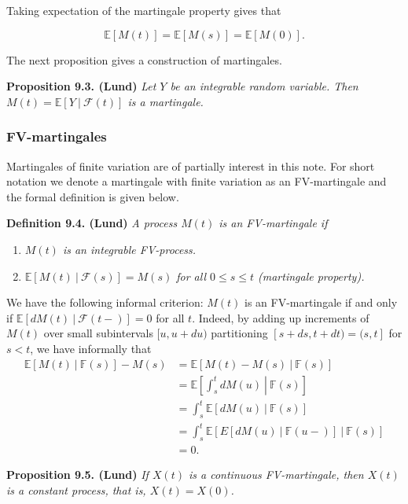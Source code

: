 \documentclass[a4paper,10pt,openany]{book}
\providecommand{\tightlist}{%
 \setlength{\itemsep}{0pt}\setlength{\parskip}{0pt}}
\begin{document}
Taking expectation of the martingale property gives that

\[
\mathbb E[M(t)]=\mathbb E[M(s)]=\mathbb E[M(0)].
\]

The next proposition gives a construction of martingales.

\textbf{Proposition 9.3. (Lund)} \emph{Let \(Y\) be an integrable random variable. Then \(M(t)=\mathbb E[Y\ \vert\ \mathcal F(t)]\) is a martingale.}

\hypertarget{fv-martingales}{%
\subsubsection{FV-martingales}\label{fv-martingales}}

Martingales of finite variation are of partially interest in this note. For short notation we denote a martingale with finite variation as an FV-martingale and the formal definition is given below.

\textbf{Definition 9.4. (Lund)} \emph{A process \(M(t)\) is an FV-martingale if}

\begin{enumerate}
\def\labelenumi{(\roman{enumi})}
\tightlist
\item
  \emph{\(M(t)\) is an integrable FV-process.}
\item
  \emph{\(\mathbb E[M(t)\ \vert\ \mathcal F(s)]=M(s)\) for all \(0\le s\le t\) (martingale property).}
\end{enumerate}

We have the following informal criterion: \(M(t)\) is an FV-martingale if and only if \(\mathbb E[dM(t)\ \vert\ \mathcal F(t−)] = 0\) for all \(t\). Indeed, by adding up increments of \(M (t)\) over small subintervals \([u, u + du)\) partitioning \([s + ds, t + dt) = (s, t]\) for \(s < t\), we have informally that
\begin{align*}
\mathbb E[M(t)\ \vert\ \mathbb F(s)]-M(s)&=\mathbb E[M(t)-M(s)\ \vert\ \mathbb F(s)]\\
&=\mathbb E\left[\left.\int_s^t dM(u)\ \right\vert\ \mathbb F(s)\right]\\
&=\int_s^t\mathbb E\left[\left. dM(u)\ \right\vert\ \mathbb F(s)\right]\\
&=\int_s^t\mathbb E\left[\left.E\left[\left. dM(u)\ \right\vert\ \mathbb F(u-)\right]\ \right\vert\ \mathbb F(s)\right]\\
&=0.
\end{align*}

\textbf{Proposition 9.5. (Lund)} \emph{If \(X(t)\) is a continuous FV-martingale, then \(X(t)\) is a constant process, that is, \(X(t) = X(0)\).}
\end{document}
